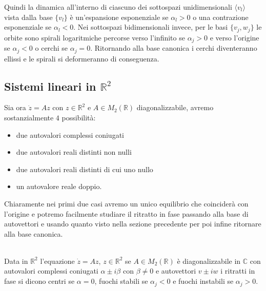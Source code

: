 \documentclass[11pt,a4paper,twoside]{book}
\newenvironment{definizione}[1][\empty]{\begin{Definizione}{
\ifx\empty#1\relax\else\mdseries\itshape#1\\\fi
}{}}{\end{Definizione}}
\theoremstyle{esss}
\theoremstyle{dotless}
\numberwithin{equation}{section} %
\begin{document}
Quindi la dinamica all'interno di ciascuno dei sottospazi unidimensionali $\langle v_l \rangle$ vista dalla base $\{v_l\}$ è un'espansione esponenziale se $\alpha_l>0$ o una contrazione esponenziale se $\alpha_l<0$.
Nei sottospazi bidimensionali invece, per le basi $\{v_j,w_j\}$ le orbite sono spirali logaritmiche percorse verso l'infinito se $\alpha_j>0$ e verso l'origine se $\alpha_j<0$ o cerchi se $\alpha_j=0$. Ritornando alla base canonica i cerchi diventeranno ellissi e le spirali si deformeranno di conseguenza.



\subsection{Sistemi lineari in $\mathbb{R}^2$}
Sia ora $\dot{z}=Az$ con $z\in\mathbb{R}^2$ e $A\in M_2(\mathbb{R})$ diagonalizzabile,  avremo sostanzialmente $4$ possibilità: 
\begin{itemize}
\item due autovalori complessi coniugati
\item due autovalori reali distinti non nulli
\item due autovalori reali distinti di cui uno nullo 
\item un autovalore reale doppio.
\end{itemize}

Chiaramente nei primi due casi avremo un unico equilibrio che coinciderà con l'origine e potremo facilmente studiare il ritratto in fase passando alla base di autovettori e usando quanto visto nella sezione precedente per poi infine ritornare alla base canonica.

\begin{definizione}
Data in $\mathbb{R}^2$ l'equazione $\dot{z}=Az$, $z\in \mathbb{R}^2$ se $A\in M_2(\mathbb{R})$ è diagonalizzabile in $\mathbb{C}$ con autovalori complessi coniugati $\alpha\pm i \beta$ con $\beta \neq 0$ e autovettori $v\pm iw$ i ritratti in fase si dicono centri se $\alpha=0$, fuochi stabili se $\alpha_j<0$ e fuochi instabili se $\alpha_j>0$.
\end{definizione}
\end{document}
